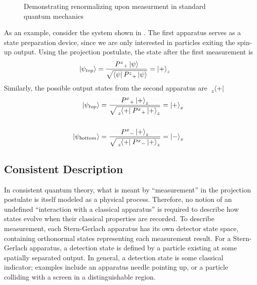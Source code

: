 \begin{figure}
\centering\CaptionFontSize
{}
\caption[Insert an abbreviated caption here to show in the List of Figures]
{Demonstrating renormalizing upon measurment in standard quantum mechanics}
\label{Figure:Measurement:Renormalizing}
\end{figure}

As an example, consider the system shown in . The first apparatus serves as a state preparation device, since we are only interested in particles exiting the spin-up output. Using the projection postulate, the state after the first measurement is
\begin{align*}
    \ket{\psi_{top}} &= \frac{{P^z}_+\ket{\psi}}{\sqrt{\bra{\psi}{P^z}_+\ket{\psi}}} = \ket{+}_z
\end{align*}
Similarly, the possible output states from the second apparatus are $\tensor[_z]{\bra{+}}{}$
\begin{align*}
    \ket{\psi_{top}} &= \frac{{P^x}_+\ket{+}_z}{\sqrt{\tensor[_z]{\bra{+}}{}{P^x}_+\ket{+}_z}} = \ket{+}_x \\ \\
    \ket{\psi_{bottom}} &= \frac{{P^x}_-\ket{+}_z}{\sqrt{\tensor[_z]{\bra{+}}{}{P^x}_-\ket{+}_z}} = \ket{-}_x
\end{align*}

\subsection{Consistent Description}
In consistent quantum theory, what is meant by ``measurement'' in the projection postulate is itself modeled as a physical process. Therefore, no notion of an undefined ``interaction with a classical apparatus'' is required to describe how states evolve when their classical properties are recorded. To describe measurement, each Stern-Gerlach apparatus has its own detector state space, containing orthonormal states representing each measurement result. For a Stern-Gerlach apparatus, a detection state is defined by a particle existing at some spatially separated output. In general, a detection state is some classical indicator; examples include an apparatus needle pointing up, or a particle colliding with a screen in a distinguishable region.

